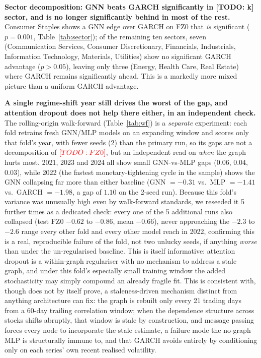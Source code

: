 \documentclass{llncs}
\newcommand{\todo}[1]{{\color{red}[TODO: #1]}}
\newcommand{\nWfSeeds}{2}
\newcommand{\gnnFZ}{\todo{FZ0}}
\newcommand{\sectorWins}{\todo{k}}
\begin{document}
\textbf{Sector decomposition: GNN beats GARCH significantly in \sectorWins{}
sector, and is no longer significantly behind in most of the rest.} Consumer
Staples shows a GNN edge over GARCH on FZ0 that \emph{is} significant
($p=0.001$, Table~\ref{tab:sector}); of the remaining ten sectors, seven
(Communication Services, Consumer Discretionary, Financials, Industrials,
Information Technology, Materials, Utilities) show no significant GARCH
advantage ($p>0.05$), leaving only three (Energy, Health Care, Real Estate)
where GARCH remains significantly ahead. This is a markedly more mixed picture
than a uniform GARCH advantage.

\textbf{A single regime-shift year still drives the worst of the gap, and
attention dropout does not help there either, in an independent check.} The
rolling-origin walk-forward (Table~\ref{tab:wf}) is a \emph{separate}
experiment: each fold retrains fresh GNN/MLP models on an expanding window
and scores only that fold's year, with fewer seeds (\nWfSeeds{}) than the
primary run, so its gaps are not a decomposition of $\gnnFZ$, but an
independent read on \emph{when} the graph hurts most. 2021, 2023 and 2024
all show small GNN-vs-MLP gaps (0.06, 0.04, 0.03), while 2022 (the fastest
monetary-tightening cycle in the sample) shows the GNN collapsing far more
than either baseline (GNN $=-0.31$ vs.\ MLP $=-1.41$ vs.\ GARCH $=-1.98$, a
gap of $1.10$ on the \nWfSeeds{}-seed run). Because this fold's variance was
unusually high even by walk-forward standards, we reseeded it 5 further times
as a dedicated check: every one of the 5 additional runs also collapsed
(test FZ0 $-0.62$ to $-0.86$, mean $-0.66$), never approaching the
$-2.3$ to $-2.6$ range every other fold and every other model reach in 2022,
confirming this is a real, reproducible failure of the fold, not two unlucky
seeds, if anything \emph{worse} than under the un-regularised baseline.
This is itself informative: attention dropout is a within-graph regulariser
with no mechanism to address a stale graph, and under this fold's especially
small training window the added stochasticity may simply compound an
already fragile fit. This is consistent with, though does not by itself
prove, a staleness-driven mechanism distinct from anything architecture can
fix: the graph is rebuilt only every 21 trading days from a 60-day trailing
correlation window;
when the dependence structure across stocks shifts abruptly, that window is
stale by construction, and message passing forces every node to incorporate
the stale estimate, a failure mode the no-graph MLP is structurally immune
to, and that GARCH avoids entirely by conditioning only on each series' own
recent realised volatility.
\end{document}
